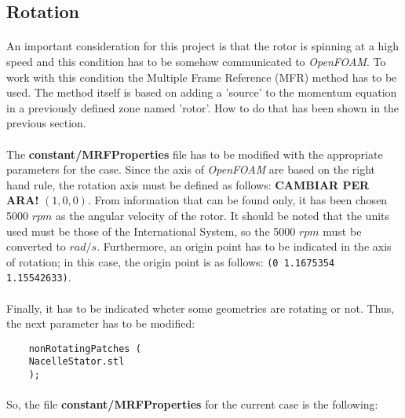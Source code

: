 \subsection{Rotation}
\paragraph{}An important consideration for this project is that the rotor is spinning at a high speed and this condition has to be somehow communicated to \textit{OpenFOAM}. To work with this condition the Multiple Frame Reference (MFR) method has to be used. The method itself is based on adding a 'source' to the momentum equation in a previously defined zone named 'rotor'. How to do that has been shown in the previous section.

\paragraph{}The \textbf{constant/MRFProperties} file has to be modified with the appropriate parameters for the case. Since the axis of \textit{OpenFOAM} are based on the right hand rule, the rotation axis must be defined as follows: \textbf{CAMBIAR PER ARA!} $(1,0,0)$. From information that can be found only, it has been chosen 5000 $rpm$ as the angular velocity of the rotor. It should be noted that the units used must be those of the International System, so the 5000 $rpm$ must be converted to $rad/s$. Furthermore, an origin point has to be indicated in the axis of rotation; in this case, the origin point is as follows: \texttt{(0 1.1675354 1.15542633)}. 

\paragraph{}Finally, it has to be indicated wheter some geometries are rotating or not. Thus, the next parameter has to be modified:

\begin{footnotesize}
\begin{verbatim}
    nonRotatingPatches (
	NacelleStator.stl
	);
\end{verbatim}
\end{footnotesize}

\paragraph{}So, the file \textbf{constant/MRFProperties} for the current case is the following:

